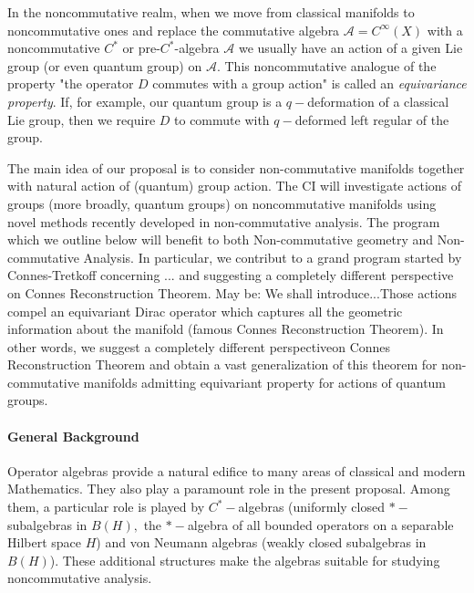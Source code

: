 \documentclass{article}
\begin{document}
In the noncommutative realm, when we move from classical manifolds to noncommutative ones and replace the commutative algebra $\mathcal{A}=C^{\infty}(X)$ with a noncommutative $C^*$ or pre-$C^*$-algebra $\mathcal{A}$ we usually have an action of a given Lie group (or even quantum group) on $\mathcal{A}.$ This noncommutative analogue of the property "the operator $D$ commutes with a group action" is called an {\it equivariance property}. If, for example, our quantum group is a $q-$deformation of a classical Lie group, then we require $D$ to commute with $q-$deformed left regular of the group.


The main idea of our proposal is to consider non-commutative manifolds together with natural action of (quantum) group action. The CI will investigate actions of groups (more broadly, quantum groups) on noncommutative manifolds using novel methods recently developed in non-commutative analysis. The program which we outline below will benefit to both Non-commutative geometry and Non-commutative Analysis. In particular, we contribut to a grand program started by Connes-Tretkoff \cite{ConnesTretkoff} concerning ... and suggesting a completely different perspective on Connes Reconstruction Theorem. {\color{red} May be: We shall introduce...}Those actions compel an equivariant Dirac operator which captures all the geometric information about the manifold (famous Connes Reconstruction Theorem). In other words, we suggest a completely different perspectiveon Connes Reconstruction Theorem and obtain a vast generalization of this theorem for non-commutative manifolds admitting equivariant property for actions of quantum groups.

\paragraph*{General Background}

Operator algebras provide a natural edifice to many areas of classical and modern Mathematics. They also play a paramount role in the present proposal. Among them, a particular role is played by $C^{\ast}-$algebras (uniformly closed $\ast-$subalgebras in $B(H),$ the $\ast-$algebra of all bounded operators on a separable Hilbert space $H$) and von Neumann algebras (weakly closed subalgebras in $B(H)$). These additional structures make the algebras suitable for studying noncommutative analysis. 
\end{document}
